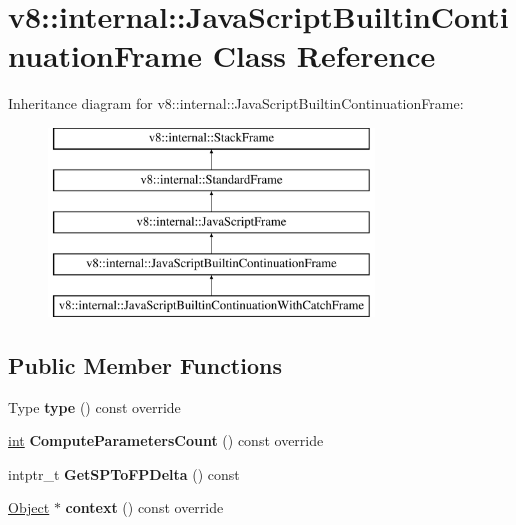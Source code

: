 \hypertarget{classv8_1_1internal_1_1JavaScriptBuiltinContinuationFrame}{}\section{v8\+:\+:internal\+:\+:Java\+Script\+Builtin\+Continuation\+Frame Class Reference}
\label{classv8_1_1internal_1_1JavaScriptBuiltinContinuationFrame}
Inheritance diagram for v8\+:\+:internal\+:\+:Java\+Script\+Builtin\+Continuation\+Frame\+:\begin{figure}[H]
\begin{center}
\leavevmode
\includegraphics[height=5.000000cm]{classv8_1_1internal_1_1JavaScriptBuiltinContinuationFrame}
\end{center}
\end{figure}
\subsection*{Public Member Functions}
\begin{DoxyCompactItemize}
\item 
\mbox{\label{classv8_1_1internal_1_1JavaScriptBuiltinContinuationFrame_a218309b4a4e1ee3f0357e5f4214a82f2}} 
Type {\bfseries type} () const override
\item 
\mbox{\label{classv8_1_1internal_1_1JavaScriptBuiltinContinuationFrame_ae9d736858b9ce0cca0907614e7c17c94}} 
\mbox{\hyperlink{classint}{int}} {\bfseries Compute\+Parameters\+Count} () const override
\item 
\mbox{\label{classv8_1_1internal_1_1JavaScriptBuiltinContinuationFrame_ab13a5d3bbd4e57e0243a1e60dfc4f30b}} 
intptr\+\_\+t {\bfseries Get\+S\+P\+To\+F\+P\+Delta} () const
\item 
\mbox{\label{classv8_1_1internal_1_1JavaScriptBuiltinContinuationFrame_ad6240c08e4272edd47bdf40230898466}} 
\mbox{\hyperlink{classv8_1_1internal_1_1Object}{Object}} $\ast$ {\bfseries context} () const override
\end{DoxyCompactItemize}
